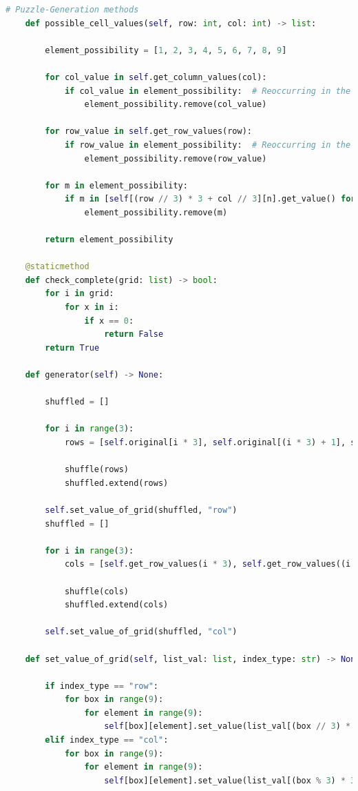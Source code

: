 \documentclass[12pt, a4paper]{report}
\begin{document}
\begin{lstlisting}[language=Python, caption=utils/classes.py]
    # Puzzle-Generation methods
    def possible_cell_values(self, row: int, col: int) -> list:

        element_possibility = [1, 2, 3, 4, 5, 6, 7, 8, 9]

        for col_value in self.get_column_values(col):
            if col_value in element_possibility:  # Reoccurring in the same column
                element_possibility.remove(col_value)

        for row_value in self.get_row_values(row):
            if row_value in element_possibility:  # Reoccurring in the same row
                element_possibility.remove(row_value)

        for m in element_possibility:
            if m in [self[(row // 3) * 3 + col // 3][n].get_value() for n in range(9)]:
                element_possibility.remove(m)

        return element_possibility

    @staticmethod
    def check_complete(grid: list) -> bool:
        for i in grid:
            for x in i:
                if x == 0:
                    return False
        return True

    def generator(self) -> None:

        shuffled = []

        for i in range(3):
            rows = [self.original[i * 3], self.original[(i * 3) + 1], self.original[(i * 3) + 2]]

            shuffle(rows)
            shuffled.extend(rows)

        self.set_value_of_grid(shuffled, "row")
        shuffled = []

        for i in range(3):
            cols = [self.get_row_values(i * 3), self.get_row_values((i * 3) + 1), self.get_row_values((i * 3) + 2)]

            shuffle(cols)
            shuffled.extend(cols)

        self.set_value_of_grid(shuffled, "col")

    def set_value_of_grid(self, list_val: list, index_type: str) -> None:

        if index_type == "row":
            for box in range(9):
                for element in range(9):
                    self[box][element].set_value(list_val[(box // 3) * 3 + element // 3][(box % 3) * 3 + element % 3])
        elif index_type == "col":
            for box in range(9):
                for element in range(9):
                    self[box][element].set_value(list_val[(box % 3) * 3 + element % 3][(box // 3) * 3 + element // 3])


\end{lstlisting}
\end{document}
